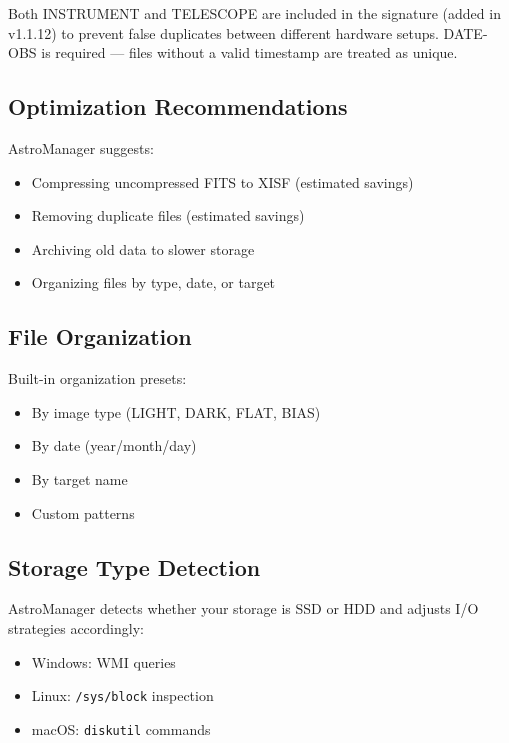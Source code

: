 \documentclass[11pt,a4paper]{article}
\begin{document}
\begin{notebox}
Both INSTRUMENT and TELESCOPE are included in the signature (added in v1.1.12) to prevent false duplicates between different hardware setups. DATE-OBS is required --- files without a valid timestamp are treated as unique.
\end{notebox}

\subsection{Optimization Recommendations}

AstroManager suggests:
\begin{itemize}
    \item Compressing uncompressed FITS to XISF (estimated savings)
    \item Removing duplicate files (estimated savings)
    \item Archiving old data to slower storage
    \item Organizing files by type, date, or target
\end{itemize}

\subsection{File Organization}

Built-in organization presets:
\begin{itemize}
    \item By image type (LIGHT, DARK, FLAT, BIAS)
    \item By date (year/month/day)
    \item By target name
    \item Custom patterns
\end{itemize}

\subsection{Storage Type Detection}

AstroManager detects whether your storage is SSD or HDD and adjusts I/O strategies accordingly:
\begin{itemize}
    \item Windows: WMI queries
    \item Linux: \texttt{/sys/block} inspection
    \item macOS: \texttt{diskutil} commands
\end{itemize}
\end{document}

